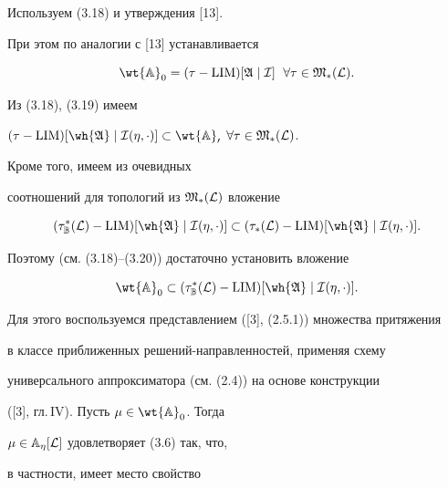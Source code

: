 \begin{pf} Используем (3.18) и утверждения [13].


При этом по аналогии с [13] устанавливается


\begin{equation}


\wt{\Bbb A}_0=(\tau-\LIM)[\frak A\mid\cal I]\ \;


\forall\tau\in\frak M_*(\cal L).


\end{equation}


Из (3.18), (3.19) имеем


$(\tau-\LIM)[\wh{\frak A}\mid \cal I(\eta,\cdot)] \subset


\wt{\Bbb A}_0$ $\forall\tau\in\frak M_*(\cal L)$.


Кроме того, имеем из очевидных


соотношений для топологий из $\frak M_*(\cal L)$ вложение


\begin{equation}


(\tau^*_{\Bbb B}(\cal L)-\LIM)[\wh{\frak A}\mid


\cal I(\eta,\cdot)] \subset (\tau_*(\cal L)-


\LIM)[\wh{\frak A}\mid\cal I(\eta,\cdot)].


\end{equation}


Поэтому (см. (3.18)--(3.20)) достаточно установить вложение


\begin{equation}


\wt{\Bbb A}_0\subset(\tau^*_{\Bbb B}(\cal L)-


\LIM)[\wh{\frak A}\mid\cal I(\eta,\cdot)].


\end{equation}


Для этого воспользуемся представлением ([3], (2.5.1)) множества притяжения


в классе приближенных решений-направленностей, применяя схему


универсального аппроксиматора (см. (2.4)) на основе конструкции


([3], гл.\,IV). Пусть $\mu\in\wt{\Bbb A}_0$. Тогда


$\mu\in {\Bbb A}_\eta[\cal L]$ удовлетворяет (3.6) так, что,


в частности, имеет место свойство


\begin{equation}



\end{equation}
\end{pf}
